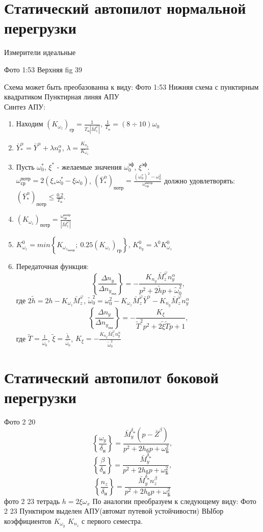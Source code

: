 \documentclass{article}
\begin{document}
\section{Статический автопилот нормальной перегрузки}
Измерители идеальные 

Фото 1:53 Верхняя  
fig 39

Схема может быть преобазованна к виду:
Фото 1:53 Нижняя схема с пунктирным квадратиком
Пунктирная линяя АПУ\\
Синтез АПУ:
\begin{enumerate}
\item Находим $(K_{\omega_z})_{гр} =\frac{1}{T_п |\bar{M}_z^{\varphi}|}$, $\frac{1}{T_п} = (8 \div 10)\omega_0$
\item $\bar{Y}_*^\alpha =\bar{Y}^\alpha + \lambda n_y^\alpha$, $\lambda = \frac{K_{n_y}}{K_{\omega_z}}$
\item Пусть $\omega_0^*$, $\xi^*$ - желаемые значения $\omega_0^{эф}$, $\xi^{эф}$.\\
$\omega_{ср}^{потр} = 2 (\xi_* \omega_0^* - \xi \omega_0)$, $(\bar{Y}_*^\alpha)_{потр} = \frac{(\omega_0^*)^2 - \omega_0^2}{\omega_{ср}^{потр}}$
должно удовлетворять: $(\bar{Y}_*^\alpha)_{потр} \leq \frac{0.2}{T_п}$.
\item $(K_{\omega_z})_{потр} = \frac{\omega_{ср}^{потр}}{|\bar{M}_z^\varphi|}$
\item $K_{\omega_z}^0 = min \left\{ K_{{\omega_z}_{потр}};\ 0.25(K_{\omega_z})_{гр} \right\}$, $K_{n_y}^0 = \lambda^0 K_{\omega_z}^0$
\item Передаточная функция:
\[
\left\{\frac{\Delta n_y}{\Delta n_{y_{зад}}} \right\}  = -\frac{K_{n_y}\bar{M}_z^\varphi n_y^\alpha }{p^2 + 2 \tilde{h} p + \tilde{\omega}_0^2},
\]
где $2 \tilde{h} = 2h - K_{\omega_z} \bar{M}_z^\varphi$, $\tilde{\omega}^{2}_0= \omega_0^2 - K_{\omega_z} \bar{M}_z^\varphi \bar{Y}^\alpha - K_{n_y} \bar{M}_z^\varphi n_y^\alpha$ 
\[
\left\{\frac{\Delta n_y}{\Delta n_{y_{зад}}} \right\} = -\frac{K_{\xi}}{\tilde{T}^2 p^2 + 2 \tilde{\xi} \tilde{T}p + 1}, 
\]
где $\tilde{T} = \frac{1}{\tilde{\omega}_0}$, $\tilde{\xi} =\frac{\tilde{h}}{\tilde{\omega_{0}}}$, $K_\xi = -\frac{K_{n_y} \bar{M}_z^\varphi n_y^\alpha}{\tilde{\omega}_0^2}$
\end{enumerate}

\section{Статический автопилот боковой перегрузки}
Фото 2 20
\[
    \left\{\frac{\omega_y}{\delta_н}\right\} = \frac{\bar{M}_y^{\delta_н}(p - \bar{Z}^\beta)}{ p^2 + 2 h_бp + \omega_Б^2 },
\]
\[
\left\{ \frac{\beta}{\delta_н} \right\} = \frac{ \bar{M}_y^{\delta_н} }{ p^2 + 2 h_бp + \omega_Б^2 }    
,\]  
\[
    \left\{ \frac{n_z}{\delta_н} \right\} = \frac{ \bar{M}_y^{\delta_н} n_z^\beta }{ p^2 + 2 h_бp + \omega_Б^2 }    
\]  
фото 2 23 тетрадь $h = 2\xi \omega_x$ 
По аналогии преобразуем к следующему виду:
Фото 2 23
Пунктиром выделен АПУ(автомат путевой устойчивости) 
ВЫбор коэффициентов $K_{\omega_y}$ $K_{n_z}$ с первого семестра.
\end{document}
